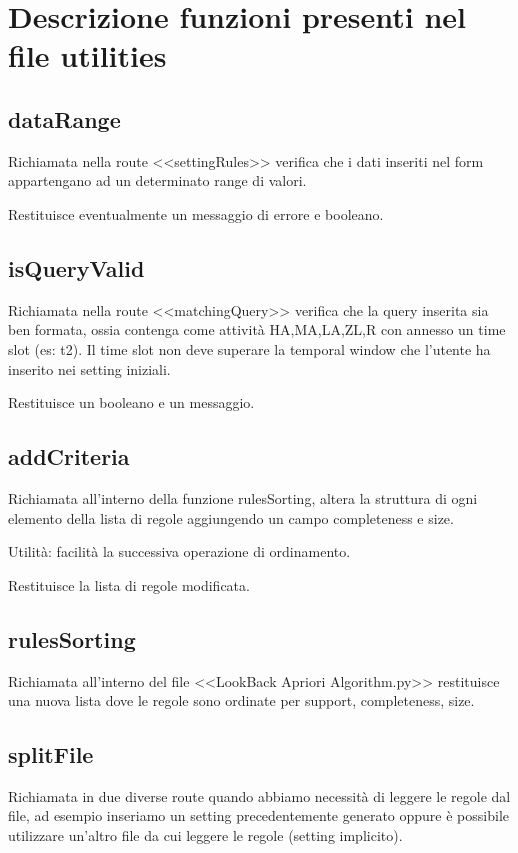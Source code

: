 \documentclass[a4paper]{article}
\begin{document}
\section{Descrizione funzioni presenti nel file utilities}
\subsection{dataRange}
Richiamata nella route <<settingRules>> verifica che i dati inseriti nel form appartengano ad un determinato range di valori.

Restituisce eventualmente un messaggio di errore e booleano.

\subsection{isQueryValid}
Richiamata nella route <<matchingQuery>> verifica che la query inserita sia ben formata, ossia contenga come attività HA,MA,LA,ZL,R con annesso un time slot (es: t2). Il time slot non deve superare la temporal window che l'utente ha inserito nei setting iniziali.

Restituisce un booleano e un messaggio.

\subsection{addCriteria}
Richiamata all'interno della funzione rulesSorting, altera la struttura di ogni elemento della lista di regole aggiungendo un campo completeness e size.

Utilità: facilità la successiva operazione di ordinamento.

Restituisce la lista di regole modificata.

\subsection{rulesSorting}
Richiamata all'interno del file <<LookBack Apriori Algorithm.py>> restituisce una nuova lista dove le regole sono ordinate per support, completeness, size.

\subsection{splitFile}
Richiamata in due diverse route quando abbiamo necessità di leggere le regole dal file, ad esempio inseriamo un setting precedentemente generato oppure è possibile utilizzare un'altro file da cui leggere le regole (setting implicito).
\end{document}
